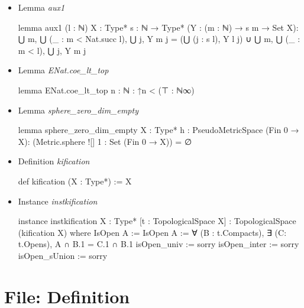 \documentclass[colorinlistoftodos]{article}
\begin{document}
\begin{itemize}
  \item Lemma \emph{aux1}
\begin{leancode}
lemma aux1 (l : ℕ) {X : Type*} {s : ℕ →  Type*} (Y : (m : ℕ) → s m → Set X):
    ⋃ m, ⋃ (_ : m < Nat.succ l), ⋃ j, Y m j = 
    (⋃ (j : s l), Y l j) ∪ ⋃ m, ⋃ (_ : m < l), ⋃ j, Y m j
\end{leancode}
  \item Lemma \emph{ENat.coe\_lt\_top}
\begin{leancode}
lemma ENat.coe_lt_top {n : ℕ} : ↑n < (⊤ : ℕ∞)
\end{leancode}
  \item Lemma \emph{sphere\_zero\_dim\_empty}
\begin{leancode}
lemma sphere_zero_dim_empty {X : Type*} {h : PseudoMetricSpace (Fin 0 → X)}:
  (Metric.sphere ![] 1 : Set (Fin 0 → X)) = ∅
\end{leancode}
  \item Definition \emph{kification}
\begin{leancode}
def kification (X : Type*) := X
\end{leancode}
  \item Instance \emph{instkification}
\begin{leancode}
instance instkification {X : Type*} [t : TopologicalSpace X] : 
TopologicalSpace (kification X) where
  IsOpen A := IsOpen A := ∀ (B : t.Compacts), ∃ (C: t.Opens), A ∩ B.1 = C.1 ∩ B.1
  isOpen_univ := sorry
  isOpen_inter := sorry
  isOpen_sUnion := sorry
\end{leancode}
\end{itemize}

\section{File: Definition}
\end{document}
